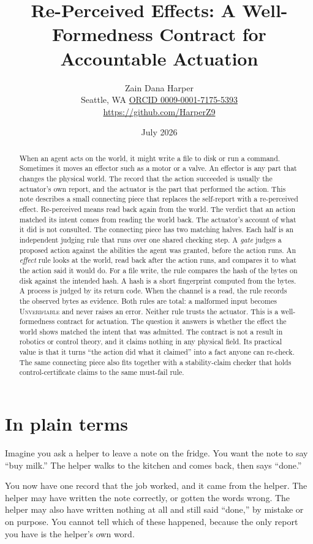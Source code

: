\documentclass[11pt]{article}
\title{\textbf{Re-Perceived Effects: A Well-Formedness Contract for Accountable Actuation}}
\author{Zain Dana Harper\\[2pt]\small Seattle, WA \quad\textbar\quad \href{https://orcid.org/0009-0001-7175-5393}{ORCID 0009-0001-7175-5393}\\[2pt]\small\url{https://github.com/HarperZ9}}
\date{July 2026}
\begin{document}
\maketitle
\begin{abstract}
When an agent acts on the world, it might write a file to disk or run a command. Sometimes it moves an effector such as a motor or a valve. An effector is any part that changes the physical world. The record that the action succeeded is usually the actuator's own report, and the actuator is the part that performed the action. This note describes a small connecting piece that replaces the self-report with a re-perceived effect. Re-perceived means read back again from the world. The verdict that an action matched its intent comes from reading the world back. The actuator's account of what it did is not consulted. The connecting piece has two matching halves. Each half is an independent judging rule that runs over one shared checking step. A \emph{gate} judges a proposed action against the abilities the agent was granted, before the action runs. An \emph{effect} rule looks at the world, read back after the action runs, and compares it to what the action said it would do. For a file write, the rule compares the hash of the bytes on disk against the intended hash. A hash is a short fingerprint computed from the bytes. A process is judged by its return code. When the channel is a read, the rule records the observed bytes as evidence. Both rules are total: a malformed input becomes \textsc{Unverifiable} and never raises an error. Neither rule trusts the actuator. This is a well-formedness contract for actuation. The question it answers is whether the effect the world shows matched the intent that was admitted. The contract is not a result in robotics or control theory, and it claims nothing in any physical field. Its practical value is that it turns ``the action did what it claimed'' into a fact anyone can re-check. The same connecting piece also fits together with a stability-claim checker that holds control-certificate claims to the same must-fail rule.
\end{abstract}

\section*{In plain terms}
Imagine you ask a helper to leave a note on the fridge. You want the note to say ``buy milk.'' The helper walks to the kitchen and comes back, then says ``done.''

You now have one record that the job worked, and it came from the helper. The helper may have written the note correctly, or gotten the words wrong. The helper may also have written nothing at all and still said ``done,'' by mistake or on purpose. You cannot tell which of these happened, because the only report you have is the helper's own word.
\end{document}
